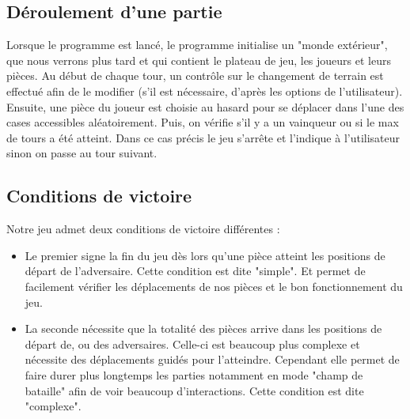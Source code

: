        \subsection{Déroulement d'une partie}
            Lorsque le programme est lancé, le programme initialise un "monde extérieur", que nous verrons plus tard et qui contient le plateau de jeu, les joueurs et leurs pièces.
            \medbreak
            Au début de chaque tour, un contrôle sur le changement de terrain est effectué afin de le modifier (s'il est nécessaire, d'après les options de l'utilisateur). \\            Ensuite, une pièce du joueur est choisie au hasard pour se déplacer dans l'une des cases accessibles aléatoirement. Puis, on vérifie s'il y a un vainqueur ou si le max de tours a été atteint. Dans ce cas précis le jeu s'arrête et l'indique à l'utilisateur sinon on passe au tour suivant.
            
        \subsection{Conditions de victoire}
            Notre jeu admet deux conditions de victoire différentes :
            \begin{itemize}
                \item Le premier signe la fin du jeu dès lors qu'une pièce atteint les positions de départ de l'adversaire. Cette condition est dite "simple". Et permet de facilement vérifier les déplacements de nos pièces et le bon fonctionnement du jeu.
                \item La seconde nécessite que la totalité des pièces arrive dans les positions de départ de, ou des adversaires. Celle-ci est beaucoup plus complexe et nécessite des déplacements guidés pour l'atteindre. Cependant elle permet de faire durer plus longtemps les parties notamment en mode "champ de bataille" afin de voir beaucoup d'interactions. Cette condition est dite "complexe".
            \end{itemize}